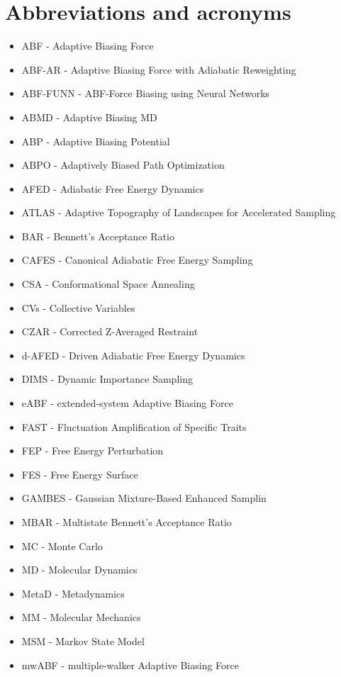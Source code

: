 \documentclass[9pt,review]{livecoms}
\begin{document}
\section{Abbreviations and acronyms}
\begin{itemize}
    \item ABF - Adaptive Biasing Force
    \item ABF-AR - Adaptive Biasing Force with Adiabatic Reweighting
    \item ABF-FUNN - ABF-Force Biasing using Neural Networks
    \item ABMD - Adaptive Biasing MD
    \item ABP - Adaptive Biasing Potential
    \item ABPO - Adaptively Biased Path Optimization
    \item AFED - Adiabatic Free Energy Dynamics
    \item ATLAS - Adaptive Topography of Landscapes for Accelerated Sampling
    \item BAR - Bennett’s Acceptance Ratio
    \item CAFES - Canonical Adiabatic Free Energy Sampling
    \item CSA - Conformational Space Annealing
    \item CVs - Collective Variables
    \item CZAR - Corrected Z-Averaged Restraint
    \item d-AFED - Driven Adiabatic Free Energy Dynamics
    \item DIMS - Dynamic Importance Sampling
    \item eABF - extended-system Adaptive Biasing Force
    \item FAST - Fluctuation Amplification of Specific Traits
    \item FEP - Free Energy Perturbation
    \item FES - Free Energy Surface
    \item GAMBES - Gaussian Mixture-Based Enhanced Samplin
    \item MBAR - Multistate Bennett’s Acceptance Ratio
    \item MC - Monte Carlo
    \item MD - Molecular Dynamics
    \item MetaD - Metadynamics
    \item MM - Molecular Mechanics
    \item MSM - Markov State Model
    \item mwABF - multiple-walker Adaptive Biasing Force

\end{itemize}
\end{document}
